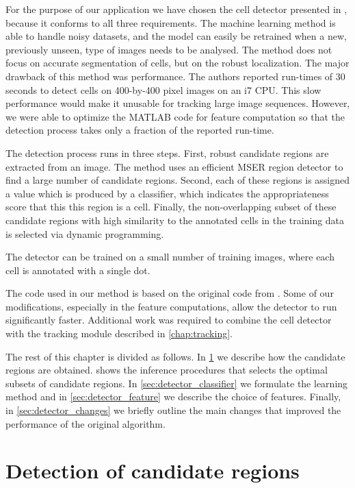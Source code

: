 	For the purpose of our application we have chosen the cell detector presented in \cite{arteta12}, because it conforms to all three requirements. The machine learning method is able to handle noisy datasets, and the model can easily be retrained when a new, previously unseen, type of images needs to be analysed. The method does not focus on accurate segmentation of cells, but on the robust localization. The major drawback of this method was performance. The authors reported run-times of 30 seconds to detect cells on 400-by-400 pixel images on an i7 CPU. This slow performance would make it unusable for tracking large image sequences. However, we were able to optimize the MATLAB code for feature computation so that the detection process takes only a fraction of the reported run-time.
	
	The detection process runs in three steps. First, robust candidate regions are extracted from an image. The method uses an efficient MSER region detector \cite{matas04} to find a large number of candidate regions. Second, each of these regions is assigned a value which is produced by a classifier, which indicates the appropriateness score that this this region is a cell. Finally, the non-overlapping subset of these candidate regions with high similarity to the annotated cells in the training data is selected via dynamic programming.
	
	The detector can be trained on a small number of training images, where each cell is  annotated with a single dot. 

	The code used in our method is based on the original code from \cite{arteta12}. Some of our modifications, especially in the feature computations, allow the detector to run significantly faster. Additional work was required to combine the cell detector with the tracking module described in \cref{chap:tracking}.
	
	The rest of this chapter is divided as follows. In \cref{sec:detector_extremal} we describe how the candidate regions are obtained.  shows the inference procedures that selects the optimal subsets of candidate regions. In \cref{sec:detector_classifier} we formulate the learning method and in \cref{sec:detector_feature} we describe the choice of features. Finally, in \cref{sec:detector_changes} we briefly outline the main changes that improved the performance of the original algorithm.
	
	\section{Detection of candidate regions \statusfirstdraft}
	\label{sec:detector_extremal}
	
